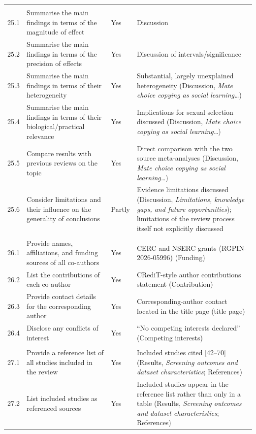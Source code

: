 \begin{longtable}{@{}p{0.9cm} p{5.5cm} p{1.4cm} p{6.0cm}@{}}
\addlinespace
\multicolumn{4}{@{}l}{\textbf{Discussion}}\\
25.1 & Summarise the main findings in terms of the magnitude of effect & Yes & Discussion \\
25.2 & Summarise the main findings in terms of the precision of effects & Yes & Discussion of intervals/significance \\
25.3 & Summarise the main findings in terms of their heterogeneity & Yes & Substantial, largely unexplained heterogeneity (Discussion, \emph{Mate choice copying as social learning\ldots}) \\
25.4 & Summarise the main findings in terms of their biological/practical relevance & Yes & Implications for sexual selection discussed (Discussion, \emph{Mate choice copying as social learning\ldots}) \\
25.5 & Compare results with previous reviews on the topic & Yes & Direct comparison with the two source meta-analyses (Discussion, \emph{Mate choice copying as social learning\ldots}) \\
25.6 & Consider limitations and their influence on the generality of conclusions & Partly & Evidence limitations discussed (Discussion, \emph{Limitations, knowledge gaps, and future opportunities}); limitations of the review process itself not explicitly discussed \\

\addlinespace
\multicolumn{4}{@{}l}{\textbf{Contributions and funding}}\\
26.1 & Provide names, affiliations, and funding sources of all co-authors & Yes & CERC and NSERC grants (RGPIN-2026-05996) (Funding) \\
26.2 & List the contributions of each co-author & Yes & CRediT-style author contributions statement (Contribution) \\
26.3 & Provide contact details for the corresponding author & Yes & Corresponding-author contact located in the title page (title page) \\
26.4 & Disclose any conflicts of interest & Yes & ``No competing interests declared'' (Competing interests) \\

\addlinespace
\multicolumn{4}{@{}l}{\textbf{References}}\\
27.1 & Provide a reference list of all studies included in the review & Yes & Included studies cited [42--70] (Results, \emph{Screening outcomes and dataset characteristics}; References) \\
27.2 & List included studies as referenced sources & Yes & Included studies appear in the reference list rather than only in a table (Results, \emph{Screening outcomes and dataset characteristics}; References) \\

\end{longtable}
\endgroup